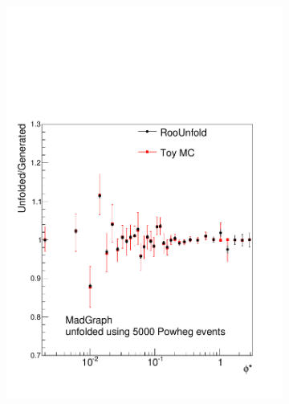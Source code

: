 \begin{figure}[!htbp]
    \centering
    \begin{subfigure}[b]{\SideBySidePlotWidth}
        \includegraphics[width=\textwidth]{figures/BinM_PM_5000.pdf}
        \caption{}
        \label{fig:unfolding_madgraph_with_5000}
    \end{subfigure}%
    \begin{subfigure}[b]{\SideBySidePlotWidth}

\end{subfigure}
\end{figure}
